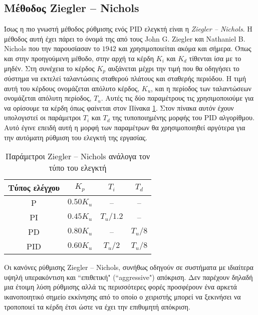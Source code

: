 \subsection{Μέθοδος Ziegler -- Nichols} \label{subsec:Ziegle-Nichols Method}

Ίσως η πιο γνωστή μέθοδος ρύθμισης ενός PID ελεγκτή είναι η \emph{Ziegler -- Nichols}. Η μέθοδος αυτή έχει πάρει το όνομά της από τους John G. Ziegler και Nathaniel B. Nichols που την παρουσίασαν το $1942$ και χρησιμοποιείται ακόμα και σήμερα. Όπως και στην προηγούμενη μέθοδο, στην αρχή τα κέρδη $K_i$ και $K_d$ τίθενται ίσα με το μηδέν. Στη συνέχεια το κέρδος $K_p$ αυξάνεται μέχρι την τιμή που θα οδηγήσει το σύστημα να εκτελεί ταλαντώσεις σταθερού πλάτους και σταθερής περιόδου. Η τιμή αυτή του κέρδους ονομάζεται απόλυτο κέρδος, $K_u$, και η περίοδος των ταλαντώσεων ονομάζεται απόλυτη περίοδος, $T_u$. Αυτές τις δύο παραμέτρους τις χρησιμοποιούμε για να ορίσουμε τα κέρδη όπως φαίνεται στον Πίνακα \ref{table:zn_method}. Στον πίνακα αυτόν έχουν υπολογιστεί οι παράμετροι $T_i$ και $T_d$ της τυποποιημένης μορφής του PID αλγορίθμου.
Αυτό έγινε επειδή αυτή η μορφή των παραμέτρων θα χρησιμοποιηθεί αργότερα για την αυτόματη ρύθμιση του ελεγκτή της εργασίας.


\begin{table}[H]
 \begin{center}
 \begin{tabular}{|c|c|c|c|}
 \hline
 Τύπος ελέγχου & $K_p$ & $T_i$ & $T_d$ \\ \hline
 P & $0.50K_u$ & -- & -- \\ \hline
 PI & $0.45K_u$ & $T_u/1.2$ & -- \\ \hline
 PD & $0.80K_u$ & -- & $T_u/8$ \\ \hline
 PID & $0.60K_u$ & $T_u/2$ & $T_u/8$ \\ \hline
 \end{tabular}
 \caption{Παράμετροι Ziegler -- Nichols ανάλογα τον τύπο του ελεγκτή}
 \label{table:zn_method}
 \end{center}
\end{table}

Οι κανόνες ρύθμισης Ziegler -- Nichols, συνήθως οδηγούν σε συστήματα με ιδιαίτερα υψηλή υπερακόντιση και ``επιθετική" (``aggressive") απόκριση. Δεν παρέχουν δηλαδή μια έτοιμη λύση ρύθμισης αλλά τις περισσότερες φορές προσφέρουν ένα αρκετά ικανοποιητικό σημείο εκκίνησης από το οποίο ο χειριστής μπορεί να ξεκινήσει να τροποποιεί τα κέρδη έτσι ώστε να έχει την επιθυμητή απόκριση.

